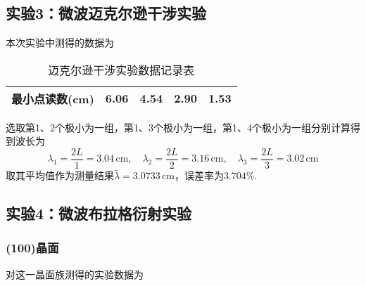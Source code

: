 \documentclass[UTF-8,twoside,cs4size]{ctexart}
\begin{document}
	\subsection{实验3：微波迈克尔逊干涉实验}
	本次实验中测得的数据为
	\begin{table}[!h]
		\centering
		\begin{tabularx}{\textwidth}{|c|Y|Y|Y|Y|}
			\hline
			最小点读数(cm) & 6.06 & 4.54 & 2.90 & 1.53\\
			\hline
		\end{tabularx}
		\caption{迈克尔逊干涉实验数据记录表}
	\end{table}

	选取第1、2个极小为一组，第1、3个极小为一组，第1、4个极小为一组分别计算得到波长为
	\[\lambda_1=\frac{2L}{1}=3.04\,\mathrm{cm},\quad\lambda_2=\frac{2L}{2}=3.16\,\mathrm{cm},\quad\lambda_3=\frac{2L}{3}=3.02\,\mathrm{cm}\]
	取其平均值作为测量结果$ \bar\lambda=3.0733\,\mathrm{cm} $，误差率为$ 3.704\% $.
	
	\subsection{实验4：微波布拉格衍射实验}
	\subsubsection{(100)晶面}
	对这一晶面族测得的实验数据为
	
\end{document}
